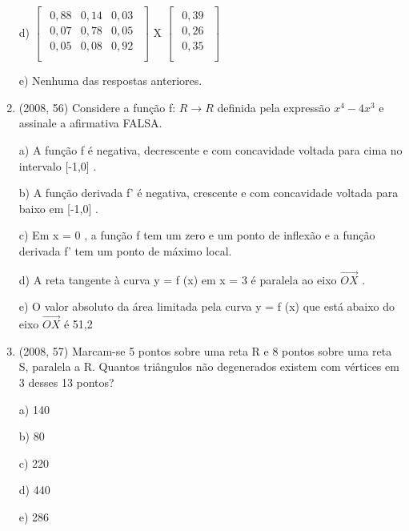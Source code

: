 \documentclass{article}
\begin{document}
\begin{enumerate}
d) $
 \left [ \begin{matrix} 
    \begin{array}{ccc}
    0,88 & 0,14 & 0,03  \\
    0,07 & 0,78 & 0,05  \\
    0,05 & 0,08 & 0,92  \\
\end{array}
\end{matrix} \right ]$ X
$
 \left [ \begin{matrix} 
    \begin{array}{c}
    0,39 \\
    0,26  \\
    0,35  \\
\end{array}
\end{matrix} \right ]$

e) Nenhuma das respostas anteriores.





\item(2008, 56) Considere a função f: $R \rightarrow R$ definida pela expressão $x^4 -4 x^3$ e assinale a afirmativa FALSA.


a) A função f é negativa, decrescente e com concavidade voltada para cima no
intervalo [-1,0] .

b) A função derivada f' é negativa, crescente e com concavidade voltada para baixo em
[-1,0] .

c) Em x = 0 , a função f tem um zero e um ponto de inflexão e a função derivada f' tem
um ponto de máximo local.

d) A reta tangente à curva y = f (x) em x = 3 é paralela ao eixo $ \overrightarrow{OX}$ .

e) O valor absoluto da área limitada pela curva y = f (x) que está abaixo do eixo $ \overrightarrow{OX}$  é 51,2 \newline




\item(2008, 57) Marcam-se 5 pontos sobre uma reta R e 8 pontos sobre uma reta S, paralela a R.
Quantos triângulos não degenerados existem com vértices em 3 desses 13 pontos?

a) 140

b) 80

c) 220

d) 440

e) 286\newline





\end{enumerate}
\end{document}
